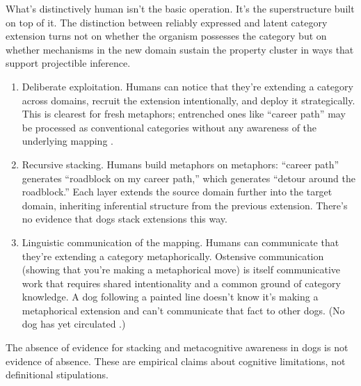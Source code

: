 \documentclass[12pt]{article}
\begin{document}
What's distinctively human isn't the basic operation. It's the superstructure built on top of it. The distinction between reliably expressed and latent category extension turns not on whether the organism possesses the category but on whether mechanisms in the new domain sustain the property cluster in ways that support projectible inference.

\begin{enumerate}
\item Deliberate exploitation. Humans can notice that they're extending a category across domains, recruit the extension intentionally, and deploy it strategically. This is clearest for fresh metaphors; entrenched ones like \enquote{career path} may be processed as conventional categories without any awareness of the underlying mapping \citep[see][]{bowdle2005}.
\item Recursive stacking. Humans build metaphors on metaphors: \enquote{career path} generates \enquote{roadblock on my career path,} which generates \enquote{detour around the roadblock.} Each layer extends the source domain further into the target domain, inheriting inferential structure from the previous extension. There's no evidence that dogs stack extensions this way.
\item Linguistic communication of the mapping. Humans can communicate that they're extending a category metaphorically. Ostensive communication (showing that you're making a metaphorical move) is itself communicative work that requires shared intentionality and a common ground of category knowledge. A dog following a painted line doesn't know it's making a metaphorical extension and can't communicate that fact to other dogs. (No dog has yet circulated .)
\end{enumerate}

\noindent The absence of evidence for stacking and metacognitive awareness in dogs is not evidence of absence. These are empirical claims about cognitive limitations, not definitional stipulations.
\end{document}
